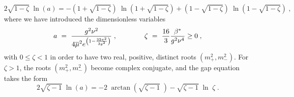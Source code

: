 \begin{equation}
2 \sqrt{1-\zeta}\; \ln(a) = -  \left( 1 +  \sqrt{1-\zeta} \right) \; \ln\left( 1 +  \sqrt{1-\zeta} \right) +  \left( 1 -  \sqrt{1-\zeta} \right) \; \ln\left( 1 - \sqrt{1-\zeta} \right)  \;, 
\label{gapd1}
\end{equation}
where we have introduced the dimensionless variables
\begin{equation}
a ~=~ \frac{g^2 \nu^2}{4 \overline{\mu}^2 e^{\left( 1 -\frac{32\pi^2}{3g^2} \right)}} \;, \qquad  \qquad \zeta ~=~ \frac{16}{3} \frac{\beta^*}{g^2\nu^4}  \geq0 \;, \label{vb1}
\end{equation}
with $0 \le \zeta < 1$ in order to have two real, positive, distinct roots $(m^2_+, m^2_-)$.
For $\zeta >1$, the roots $(m^2_+, m^2_-)$ become complex conjugate, and the gap equation takes the form
\begin{equation}
2 \sqrt{\zeta -1} \; \ln(a) =   -2 \; \arctan\left({\sqrt{\zeta-1}}\; \right)   - \sqrt{\zeta-1} \; \ln\;\zeta  \;. \label{d1}
\end{equation}

